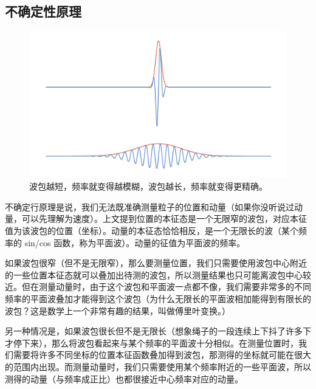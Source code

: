 \subsection{不确定性原理}

\begin{figure}[ht]
\centering
\includegraphics[width=14cm]{./figures/QM05.pdf}
\caption{波包越短，频率就变得越模糊，波包越长，频率就变得更精确。} \label{QM0_fig5}
\end{figure}

不确定行原理是说，我们无法既准确测量粒子的位置和动量（如果你没听说过动量，可以先理解为速度）。上文提到位置的本征态是一个无限窄的波包，对应本征值为该波包的位置（坐标）。动量的本征态恰恰相反，是一个无限长的波（某个频率的 sin/cos 函数，称为平面波）。动量的征值为平面波的频率。

如果波包很窄（但不是无限窄），那么要测量位置，我们只需要使用波包中心附近的一些位置本征态就可以叠加出待测的波包，所以测量结果也只可能离波包中心较近。但在测量动量时，由于这个波包和平面波一点都不像，我们需要非常多的不同频率的平面波叠加才能得到这个波包（为什么无限长的平面波相加能得到有限长的波包？这是数学上一个非常有趣的结果，叫做傅里叶变换。）

另一种情况是，如果波包很长但不是无限长（想象绳子的一段连续上下抖了许多下才停下来），那么将波包看起来与某个频率的平面波十分相似。在测量位置时，我们需要将许多不同坐标的位置本征函数叠加得到波包，那测得的坐标就可能在很大的范围内出现。而测量动量时，我们只需要使用某个频率附近的一些平面波，所以测得的动量（与频率成正比）也都很接近中心频率对应的动量。

